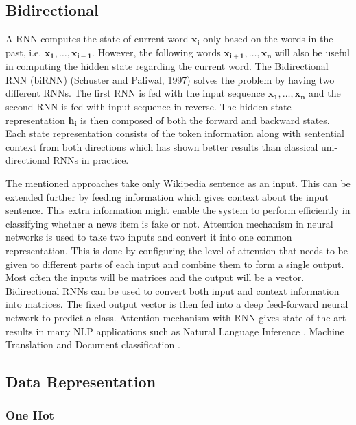 \documentclass[a4paper, 11pt]{article}
\begin{document}
\subsection{Bidirectional}
A RNN computes the state of current word $\mathbf{x_{i}}$ only based on the words in the past, i.e. $\mathrm{\mathbf{x_1},\dots,\mathbf{x_{i-1}}}$. However, the following words $\mathrm{\mathbf{x_{i+1}},\dots,\mathbf{x_{n}}}$ will also be useful in computing the hidden state regarding the current word. The Bidirectional RNN (biRNN) (Schuster and Paliwal, 1997) solves the problem by having two different RNNs. The first RNN is fed with the input sequence $\mathrm{\mathbf{x_{1}},\dots,\mathbf{x_{n}}}$ and the second RNN is fed with input sequence in reverse. The hidden state representation $\mathbf{h_{i}}$ is then composed of both the forward and backward states. Each state representation consists of the token information along with sentential context from both directions which has shown better results than classical uni-directional RNNs in practice.

The mentioned approaches take only Wikipedia sentence as an input. This can be extended further by feeding information which gives context about the input sentence. This extra information might enable the system to perform efficiently in classifying whether a news item is fake or not. Attention mechanism in neural networks is used to take two inputs and convert it into one common representation. This is done by configuring the level of attention that needs to be given to different parts of each input and combine them to form a single output. Most often the inputs will be matrices and the output will be a vector. Bidirectional RNNs can be used to convert both input and context information into matrices. The fixed output vector is then fed into a deep feed-forward neural network to predict a class. Attention mechanism with RNN gives state of the art results in many NLP applications such as Natural Language Inference \parencite{Parikh2016}, Machine Translation \parencite{Bahdanau2014} and Document classification \parencite{Yang2016}.

\subsection{Data Representation}

\subsubsection{One Hot}
\end{document}
